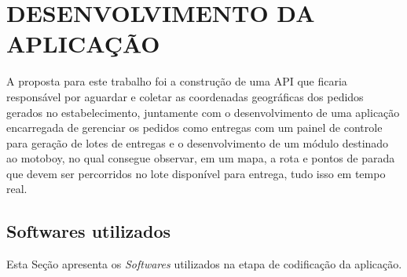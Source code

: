 
\chapter{DESENVOLVIMENTO DA APLICAÇÃO}
A proposta para este trabalho foi a construção de uma API que ficaria responsável
por aguardar e coletar as coordenadas geográficas dos pedidos gerados no estabelecimento,
juntamente com o desenvolvimento de uma aplicação encarregada de gerenciar os pedidos como entregas
com um painel de controle para geração de lotes de entregas e o desenvolvimento de um módulo destinado ao motoboy, no qual consegue observar, em um mapa, a rota e pontos de parada que devem ser percorridos no lote disponível para entrega, tudo isso em tempo real.

\section{Softwares utilizados}

Esta Seção apresenta os \textit{Softwares} utilizados na etapa de codificação da aplicação.

